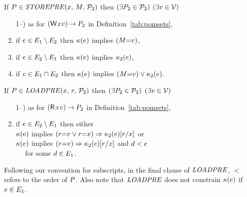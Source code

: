 \begin{definition}
  \noindent
  If $\aPS\SB0 \in \sSTOREPRE{\aLoc}{\aExp}{\aPSS_2}$ then
  $(\exists\aPS_2\in\aPSS_2)$
  $(\exists\aVal\in\Val)$
  \begin{enumerate}
     \setcounter{enumi}{\value{pomsetPrefixOrderCount}}
  \item[1--\thepomsetPrefixOrderCount)] as for $\DWP{\aLoc}{\aVal}\sPREFIX\aPS_2$ in
    Definition~\ref{tab:pomsets}, %
  \item if $\aEv\in\aEvs_1\setminus\aEvs_2$ then $\labelingForm\SB0(\aEv)$ implies $(\aExp{=}\aVal)$,
  \item if $\aEv\in\aEvs_2\setminus\aEvs_1$ then $\labelingForm\SB0(\aEv)$ implies $\labelingForm_2(\aEv)$,
  \item if $\aEv\in\aEvs_1\cap\aEvs_2$ then $\labelingForm\SB0(\aEv)$ implies $(\aExp{=}\aVal)\lor \labelingForm_2(\aEv)$.
  \end{enumerate}

  \noindent
  If $\aPS\SB0 \in \sLOADPRE{\aLoc}{\aReg}{\aPSS_2}$ then
  $(\exists\aPS_2\in\aPSS_2)$
  $(\exists\aVal\in\Val)$
  \begin{enumerate}
     \setcounter{enumi}{\value{pomsetPrefixOrderCount}}
  \item[1--\thepomsetPrefixOrderCount)] as for $\DRP{\aLoc}{\aVal}\sPREFIX\aPS_2$ in
    Definition~\ref{tab:pomsets}, %
  \item if $\aEv\in\aEvs_2\setminus\aEvs_1$ then either \\
    $\labelingForm\SB0(\aEv)$ implies $(\aReg{=}\aVal\lor\aReg{=}\aLoc)\limplies\labelingForm_2(\aEv)[\aReg/\aLoc]$ or\\
    $\labelingForm\SB0(\aEv)$ implies $(\aReg{=}\aVal)\limplies\labelingForm_2(\aEv)[\aReg/\aLoc]$ and $\bEv<\SB0\aEv$ \\
    \mbox{$\quad$} for some $\bEv\in\aEvs_1$.
  \end{enumerate}  
\end{definition}
Following our convention for subscripts, in the final clause of
$\sLOADPRE{}{}{}$, $<$ refers to the order of $\aPS$.  Also note that
$\sLOADPRE{}{}{}$ does not constrain $\labelingForm\SB0(\aEv)$ if
$\aEv\in\aEvs_1$.

